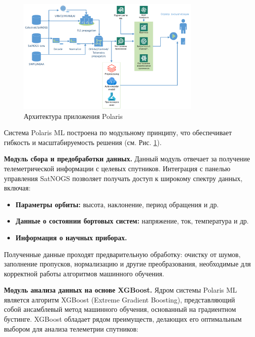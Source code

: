 \documentclass[14pt, a4paper]{extreport}
\begin{document}
    \begin{figure}[htbp]
        \centering
        \includegraphics[width=0.8\textwidth]{polaris_architecture}
        \caption{Архитектура приложения Polaris}
        \label{fig:polaris_architecture}
    \end{figure}

    Система Polaris ML построена по модульному принципу, что обеспечивает гибкость и масштабируемость решения (см. Рис. \ref{fig:polaris_architecture}).

    \textbf{Модуль сбора и предобработки данных.} Данный модуль отвечает за получение телеметрической информации с целевых спутников.
    Интеграция с панелью управления SatNOGS позволяет получать доступ к широкому спектру данных, включая:
    \begin{itemize}
        \item \textbf{Параметры орбиты:} высота, наклонение, период обращения и др.
        \item \textbf{Данные о состоянии бортовых систем:} напряжение, ток, температура и др.
        \item \textbf{Информация о научных приборах.}
    \end{itemize}

    Полученные данные проходят предварительную обработку: очистку от шумов, заполнение пропусков, нормализацию и другие преобразования, необходимые для корректной работы алгоритмов машинного обучения.

    \textbf{Модуль анализа данных на основе XGBoost.} Ядром системы Polaris ML является алгоритм XGBoost (Extreme Gradient Boosting), представляющий собой ансамблевый метод машинного обучения, основанный на градиентном бустинге.
    XGBoost обладает рядом преимуществ, делающих его оптимальным выбором для анализа телеметрии спутников:
\end{document}
